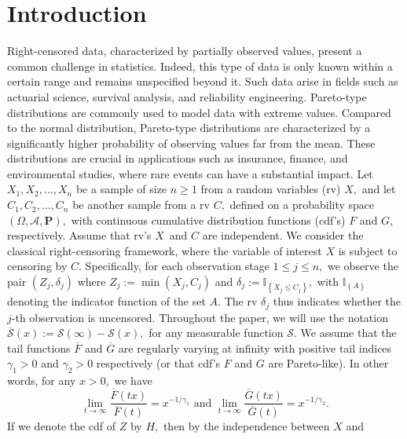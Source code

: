 \documentclass[reqno,openbib,runningheads,a4paper,12pt]{amsart}%
\begin{document}
\section{\textbf{Introduction\label{sec1}}}

\noindent Right-censored data, characterized by partially observed values,
present a common challenge in statistics. Indeed, this type of data is only
known within a certain range and remains unspecified beyond it. Such data
arise in fields such as actuarial science, survival analysis, and reliability
engineering. Pareto-type distributions are commonly used to model data with
extreme values. Compared to the normal distribution, Pareto-type distributions
are characterized by a significantly higher probability of observing values
far from the mean. These distributions are crucial in applications such as
insurance, finance, and environmental studies, where rare events can have a
substantial impact. Let $X_{1},X_{2},...,X_{n}$ be a sample of size $n\geq1$
from a random variables (rv) $X,$ and let $C_{1},C_{2},...,C_{n}$ be another
sample from a rv $C,$ defined on a probability space $\left(  \Omega
,\mathcal{A},\mathbf{P}\right)  ,$ with continuous cumulative distribution
functions (cdf's) $F$ and $G,$ respectively. Assume that rv's $X$\ and $C$ are
independent. We consider the classical right-censoring framework, where the
variable of interest $X$ is subject to censoring by $C.$ Specifically, for
each observation stage $1\leq j\leq n,$ we observe the pair $\left(
Z_{j},\delta_{j}\right)  $ where $Z_{j}:=\min\left(  X_{j},C_{j}\right)  $ and
$\delta_{j}:=\mathbb{I}_{\left\{  X_{j}\leq C_{j}\right\}  },$ with
$\mathbb{I}_{\left\{  A\right\}  }$ denoting the indicator function of the set
$A.$ The rv $\delta_{j}$ thus indicates whether the $j$-th observation is
uncensored. Throughout the paper, we will use the notation $\overline
{\mathcal{S}}(x):=\mathcal{S}(\infty)-\mathcal{S}(x),$ for any measurable
function $\mathcal{S}.$ We assume that the tail functions $\overline{F}$ and
$\overline{G}$ are regularly varying at infinity with positive tail indices
$\gamma_{1}>0$ and $\gamma_{2}>0$ respectively (or that cdf's $F$ and $G$ are
Pareto-like). In other words, for any $x>0,$ we have%
\begin{equation}
\lim_{t\rightarrow\infty}\frac{\overline{F}(tx)}{\overline{F}(t)}%
=x^{-1/\gamma_{1}}\text{ and }\lim_{t\rightarrow\infty}\frac{\overline{G}%
(tx)}{\overline{G}(t)}=x^{-1/\gamma_{2}}. \label{RV}%
\end{equation}
If we denote the cdf of $Z$ by $H,$ then by the independence between $X$ and
\end{document}
